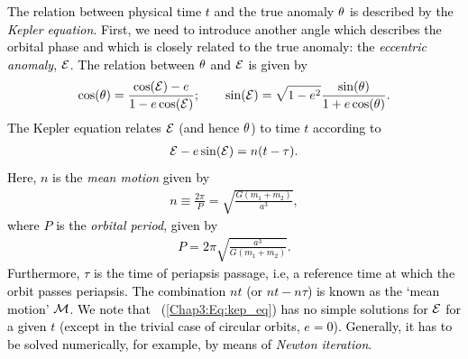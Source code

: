 \documentclass[main.tex]{subfiles}
\begin{document}
\begin{tcolorbox}[sharp corners, colback=blue!30, colframe=blue!80!blue, title=Box \ref{boxchap3:dynIII} -- Orbital Dynamics III (continued)]
\par \textcolor{black}{The relation between physical time $t$ and the true anomaly $\theta$ is described by the {\it Kepler equation}. First, we need to introduce another angle which describes the orbital phase and which is closely related to the true anomaly: the {\it eccentric anomaly}, $\mathcal{E}$. The relation between $\theta$ and $\mathcal{E}$ is given by
\begin{align}
\label{Chap3:Eq:EA_to_TA}
\cos(\theta) = \frac{\cos(\mathcal{E}) - e}{1 - e \cos(\mathcal{E})}; \qquad \sin(\mathcal{E}) = \sqrt{1-e^2} \frac{\sin(\theta)}{1+e\cos(\theta)}.
\end{align}
The Kepler equation relates $\mathcal{E}$ (and hence $\theta$) to time $t$ according to
\begin{align}
\label{Chap3:Eq:kep_eq}
\mathcal{E} - e \sin(\mathcal{E}) = n(t-\tau).
\end{align}
Here, $n$ is the {\it mean motion} given by
\begin{align}
n \equiv \frac{2\pi}{P} = \sqrt{\frac{G(m_1+m_2)}{a^3}},
\end{align}
where $P$ is the {\it orbital period}, given by
\begin{align}
\label{Chap3:Eq:kepl}
P = 2 \pi \sqrt{\frac{a^3}{G(m_1+m_2)}}.
\end{align}
Furthermore, $\tau$ is the time of periapsis passage, i.e, a reference time at which the orbit passes periapsis. The combination $n t$ (or $nt - n\tau$) is known as the `mean motion' $\mathcal{M}$. We note that \Eq~(\ref{Chap3:Eq:kep_eq}) has no simple solutions for $\mathcal{E}$ for a given $t$ (except in the trivial case of circular orbits, $e=0$). Generally, it has to be solved numerically, for example, by means of {\it Newton iteration}.}
\end{tcolorbox}
\end{document}
